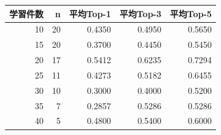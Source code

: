 \begin{tabular}{r r r r r}
\hline
学習件数 & n & 平均Top-1 & 平均Top-3 & 平均Top-5 \\
\hline
10 & 20 & 0.4350 & 0.4950 & 0.5650 \\
15 & 20 & 0.3700 & 0.4450 & 0.5450 \\
20 & 17 & 0.5412 & 0.6235 & 0.7294 \\
25 & 11 & 0.4273 & 0.5182 & 0.6455 \\
30 & 10 & 0.3000 & 0.4000 & 0.5200 \\
35 & 7 & 0.2857 & 0.5286 & 0.5286 \\
40 & 5 & 0.4800 & 0.5400 & 0.6000 \\
\hline
\end{tabular}
